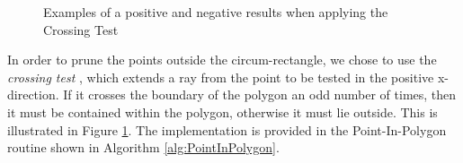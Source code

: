 \begin{figure}%
    \centering
    \caption{Examples of a positive and negative results when applying the Crossing Test}%
    \label{fig:CrossingTest}%
\end{figure}

\pagebreak
In order to prune the points outside the circum-rectangle, we chose to use the \textit{crossing test} \cite{Shimrat1962Algorithms}, which extends a ray from the point to be tested in the positive x-direction. If it crosses the boundary of the polygon an odd number of times, then it must be contained within the polygon, otherwise it must lie outside. This is illustrated in Figure \ref{fig:CrossingTest}. The implementation is provided in the Point-In-Polygon routine shown in Algorithm \ref{alg:PointInPolygon}.%


